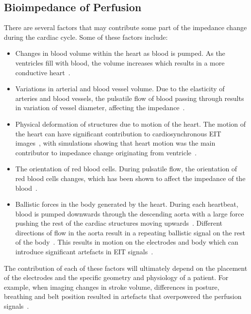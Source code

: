 \subsection{Bioimpedance of Perfusion} \label{sec:origins}
There are several factors that may contribute some part of 
the impedance change during the cardiac cycle. 
Some of these factors include:
\begin{itemize}
    \item Changes in blood volume within the heart as blood is pumped. As the ventricles 
          fill with blood,
          the volume increases which results in a more conductive
          heart~\parencite{nyboer_impedance_1970}.
    \item Variations in arterial and blood vessel volume. Due to the elasticity of arteries 
          and
          blood vessels, the pulsatile flow of blood passing through results in variation of 
          vessel diameter, affecting the impedance~\parencite{eyuboglu_localisation_1987}.
    \item Physical deformation of structures due to motion of the heart. The
          motion of the heart can have significant contribution 
          to cardiosynchronous EIT 
          images~\parencite{proenca_influence_2015,adler_origins_2017}, 
          with simulations showing that heart motion was the 
          main contributor to impedance change originating from
          ventricle~\parencite{proenca_influence_2015}. 
    \item The orientation of red blood cells. During pulsatile flow, the orientation of
          red blood cells changes, which has been shown to affect the impedance of the 
          blood~\parencite{gaw_effect_2010}. 
    \item Ballistic forces in the body generated by the heart. During each
          heartbeat, blood is pumped downwards through the descending
          aorta with a large force pushing the rest of the cardiac structures moving
          upwards~\parencite{gordon_certain_1877}. Different directions 
          of flow in the aorta result in a repeating ballistic 
          signal on the rest of the body~\parencite{kim_ballistocardiogram_2016}. This results in 
          motion on the electrodes and body which can introduce significant
          artefacts in EIT signals~\parencite{adler_impedance_1994}.
\end{itemize}

The contribution of each of these factors will ultimately depend on the placement
of the electrodes and the specific geometry and physiology of a patient. 
For example, when imaging changes in stroke volume, differences in 
posture, breathing and belt 
position resulted in artefacts that overpowered the 
perfusion signals~\parencite{patterson_variability_2001}.  

